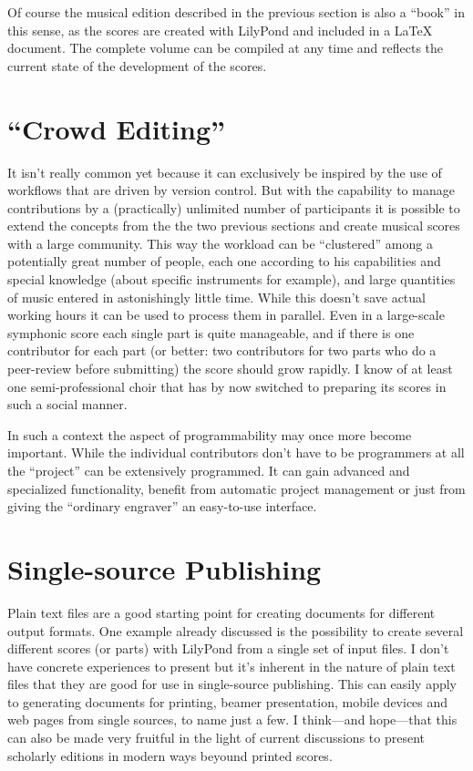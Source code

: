 \documentclass[DIV=12]{scrreprt}
\begin{document}
Of course the musical edition described in the previous section is also a “book” in this sense, as the scores are created with LilyPond and included in a \LaTeX{} document.
The complete volume can be compiled at any time and reflects the current state of the development of the scores.


\section{“Crowd Editing”}
\label{sec:pt_crowd-editing}

It isn't really common yet because it can exclusively be inspired by the use of workflows that are driven by version control.
But with the capability to manage contributions by a (practically) unlimited number of participants it is possible to extend the concepts from the the two previous sections and create musical scores with a large community.
This way the workload can be “clustered” among a potentially great number of people, each one according to his capabilities and special knowledge (about specific instruments for example), and large quantities of music entered in astonishingly little time.
While this doesn't save actual working hours it can be used to process them in parallel.
Even in a large-scale symphonic score each single part is quite manageable, and if there is one contributor for each part (or better: two contributors for two parts who do a peer-review before submitting) the score should grow rapidly.
I know of at least one semi-professional choir that has by now switched to preparing its scores in such a social manner.

In such a context the aspect of programmability may once more become important.
While the individual contributors don't have to be programmers at all the “project” can be extensively programmed.
It can gain advanced and specialized functionality, benefit from automatic project management or just from giving the “ordinary engraver” an easy-to-use interface.

\section{Single-source Publishing}
\label{sec:pt_single-source-publishing}

Plain text files are a good starting point for creating documents for different output formats.
One example already discussed is the possibility to create several different scores (or parts) with LilyPond from a single set of input files.
I don't have concrete experiences to present but it's inherent in the nature of plain text files that they are good for use in single-source publishing.
This can easily apply to generating documents for printing, beamer presentation, mobile devices and web pages from single sources, to name just a few.
I think---and hope---that this can also be made very fruitful in the light of current discussions to present scholarly editions in modern ways beyound printed scores.
\end{document}
